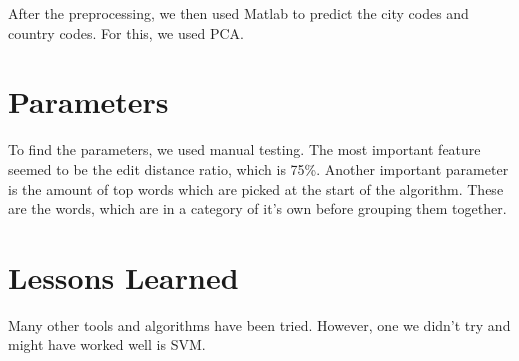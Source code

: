 \documentclass[a4paper, 11pt]{article}
\begin{document}
After the preprocessing, we then used Matlab to predict the city codes and country codes. For this, we used PCA.

\section{Parameters}
To find the parameters, we used manual testing. The most important feature seemed to be the edit distance ratio, which is 75\%. Another important parameter is the amount of top words which are picked at the start of the algorithm. These are the words, which are in a category of it's own before grouping them together.

\section{Lessons Learned}
Many other tools and algorithms have been tried. However, one we didn't try and might have worked well is SVM.
\end{document}
